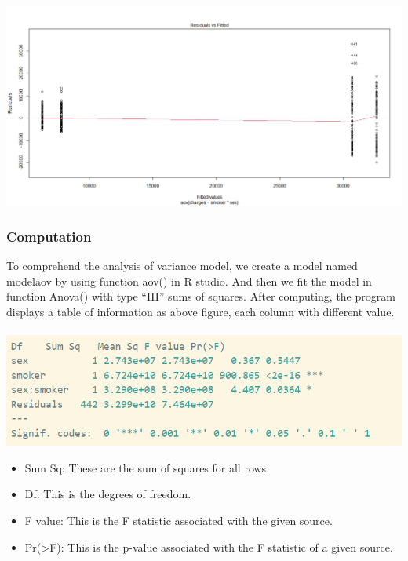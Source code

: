 \documentclass[a4paper]{article}
\begin{document}
\includegraphics[width=15cm]{img/homogenity.png}
\subsubsection{Computation}
To comprehend the analysis of variance model, we create a model named modelaov by using function aov() in R studio. And then we fit the model in function Anova() with type “III” sums of squares. After computing, the program displays a table of information as above figure, each column with different value. \\ \\
\includegraphics[width=14cm]{img/computation.png}
\begin{itemize}
    \item Sum Sq: These are the sum of squares for all rows.
    \item Df: This is the degrees of freedom. 
    \item F value: This is the F statistic associated with the given source. 
    \item Pr(>F): This is the p-value associated with the F statistic of a given source. 
\end{itemize}
\end{document}
